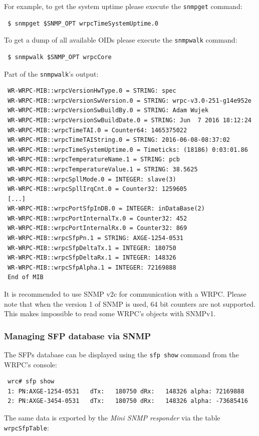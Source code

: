 \documentclass[a4paper, 12pt]{article}
\renewcommand{\_}{\underscore\allowbreak}
\begin{document}
For example, to get the system uptime please execute the \texttt{snmpget} command:
\begin{lstlisting}
 $ snmpget $SNMP_OPT wrpcTimeSystemUptime.0
\end{lstlisting}
To get a dump of all available OIDs please execute the \texttt{snmpwalk}
command:
\begin{lstlisting}
 $ snmpwalk $SNMP_OPT wrpcCore
\end{lstlisting}
Part of the \texttt{snmpwalk}'s output:
\begin{lstlisting}
 WR-WRPC-MIB::wrpcVersionHwType.0 = STRING: spec
 WR-WRPC-MIB::wrpcVersionSwVersion.0 = STRING: wrpc-v3.0-251-g14e952e
 WR-WRPC-MIB::wrpcVersionSwBuildBy.0 = STRING: Adam Wujek
 WR-WRPC-MIB::wrpcVersionSwBuildDate.0 = STRING: Jun  7 2016 18:12:24
 WR-WRPC-MIB::wrpcTimeTAI.0 = Counter64: 1465375022
 WR-WRPC-MIB::wrpcTimeTAIString.0 = STRING: 2016-06-08-08:37:02
 WR-WRPC-MIB::wrpcTimeSystemUptime.0 = Timeticks: (18186) 0:03:01.86
 WR-WRPC-MIB::wrpcTemperatureName.1 = STRING: pcb
 WR-WRPC-MIB::wrpcTemperatureValue.1 = STRING: 38.5625
 WR-WRPC-MIB::wrpcSpllMode.0 = INTEGER: slave(3)
 WR-WRPC-MIB::wrpcSpllIrqCnt.0 = Counter32: 1259605
 [...]
 WR-WRPC-MIB::wrpcPortSfpInDB.0 = INTEGER: inDataBase(2)
 WR-WRPC-MIB::wrpcPortInternalTx.0 = Counter32: 452
 WR-WRPC-MIB::wrpcPortInternalRx.0 = Counter32: 869
 WR-WRPC-MIB::wrpcSfpPn.1 = STRING: AXGE-1254-0531
 WR-WRPC-MIB::wrpcSfpDeltaTx.1 = INTEGER: 180750
 WR-WRPC-MIB::wrpcSfpDeltaRx.1 = INTEGER: 148326
 WR-WRPC-MIB::wrpcSfpAlpha.1 = INTEGER: 72169888
 End of MIB
\end{lstlisting}

It is recommended to use SNMP v2c for communication with a WRPC.
Please note that when the version 1 of SNMP is used, 64 bit counters are not
supported. This makes impossible to read some WRPC's objects with
SNMPv1.

\subsubsection{Managing SFP database via SNMP}
\label{Managing SFP database via SNMP}

The SFPs database can be displayed using the \texttt{sfp show} command from
the WRPC's console:
\begin{lstlisting}
 wrc# sfp show
 1: PN:AXGE-1254-0531   dTx:   180750 dRx:   148326 alpha: 72169888
 2: PN:AXGE-3454-0531   dTx:   180750 dRx:   148326 alpha: -73685416
\end{lstlisting}
The same data is exported by the \textit{Mini SNMP responder} via the table
\texttt{wrpcSfpTable}:
\end{document}
